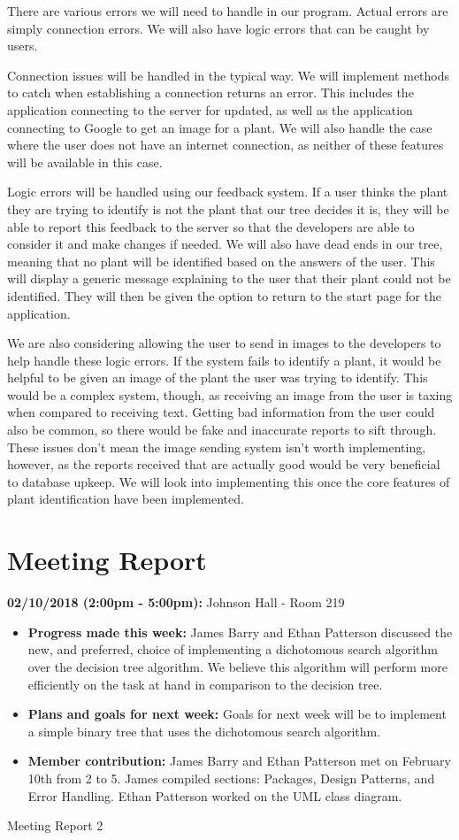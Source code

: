 \documentclass[a4paper]{article}
\begin{document}
There are various errors we will need to handle in our program. Actual errors are simply connection errors. We will also have logic errors that can be caught by users.

Connection issues will be handled in the typical way. We will implement methods to catch when establishing a connection returns an error. This includes the application connecting to the server for updated, as well as the application connecting to Google to get an image for a plant. We will also handle the case where the user does not have an internet connection, as neither of these features will be available in this case.

Logic errors will be handled using our feedback system. If a user thinks the plant they are trying to identify is not the plant that our tree decides it is, they will be able to report this feedback to the server so that the developers are able to consider it and make changes if needed. We will also have dead ends in our tree, meaning that no plant will be identified based on the answers of the user. This will display a generic message explaining to the user that their plant could not be identified. They will then be given the option to return to the start page for the application.

We are also considering allowing the user to send in images to the developers to help handle these logic errors. If the system fails to identify a plant, it would be helpful to be given an image of the plant the user was trying to identify. This would be a complex system, though, as receiving an image from the user is taxing when compared to receiving text. Getting bad information from the user could also be common, so there would be fake and inaccurate reports to sift through. These issues don't mean the image sending system isn't worth implementing, however, as the reports received that are actually good would be very beneficial to database upkeep. We will look into implementing this once the core features of plant identification have been implemented. 

\pagebreak
\section{Meeting Report}
\textbf{02/10/2018 (2:00pm - 5:00pm):} Johnson Hall - Room 219
\begin{itemize}
\item \textbf{Progress made this week:} James Barry and Ethan Patterson discussed the new, and preferred, choice of implementing a dichotomous search algorithm over the decision tree algorithm. We believe this algorithm will perform more efficiently on the task at hand in comparison to the decision tree.
\item \textbf{Plans and goals for next week:} Goals for next week will be to implement a simple binary tree that uses the dichotomous search algorithm.
\item \textbf{Member contribution:} James Barry and Ethan Patterson met on February 10th from 2 to 5. James compiled sections: Packages, Design Patterns, and Error Handling. Ethan Patterson worked on the UML class diagram. 
\end{itemize}
Meeting Report 2
\end{document}
